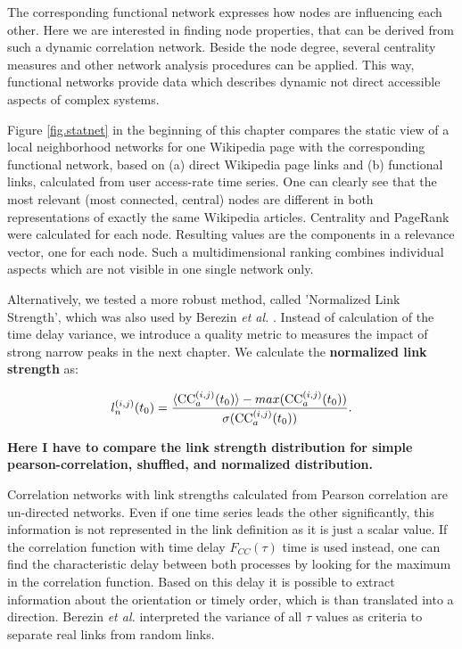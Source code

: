 \documentclass[a4paper,10pt]{scrbook}
\begin{document}
The corresponding functional network expresses how nodes are influencing each other. Here we are interested in finding node properties, that can be derived from such a dynamic correlation network. Beside the node degree, several centrality measures and other network analysis procedures can be applied. This way, functional networks provide data which describes dynamic not direct accessible aspects of complex systems.

Figure \ref{fig.statnet} in the beginning of this chapter compares the static view of a  local neighborhood networks for one Wikipedia page with the corresponding functional network, based on (a) direct Wikipedia page links and (b) functional links, calculated from user access-rate time series. One can clearly see that the most relevant (most
connected, central) nodes are different in both representations of exactly
the same Wikipedia articles. Centrality and PageRank were calculated for each node. Resulting values are the components in a relevance vector, one for each node. Such a multidimensional ranking combines individual aspects which are not visible in one single network only. 

Alternatively, we tested a more robust method, called 'Normalized Link Strength', which was also used by Berezin \textit{et al.} \cite{Berezin2011}. Instead of calculation of the time delay variance, we introduce a quality metric to measures the impact of strong narrow peaks in the next chapter. We calculate the \textbf{normalized link strength} as:

\begin{equation}
l_n^{(i,j)}(t_0) =  \frac{ \langle {\rm CC}_a^{(i,j)}(t_0) \rangle - max( {\rm CC}_{a}^{(i,j)}(t_0) ) }{ \sigma ( {\rm CC}_a^{(i,j)}(t_0) ) }.
\end{equation} 


\textbf{Here I have to compare the link strength distribution for simple pearson-correlation, shuffled, and normalized distribution.}

 
 
 
Correlation networks with link strengths calculated from Pearson correlation are un-directed networks. Even if one time series leads the other significantly, this information is not represented in the link definition as it is just a scalar value. If the correlation function with time delay $F_{CC}(\tau)$ time is used instead, one can find the characteristic delay between both processes by looking for the maximum in the correlation function. Based on this delay it is possible to extract information about the orientation or timely order, which is than translated into a direction. Berezin \textit{et al.} interpreted the variance of all $\tau$ values as criteria to separate real links from random links. 
\end{document}
